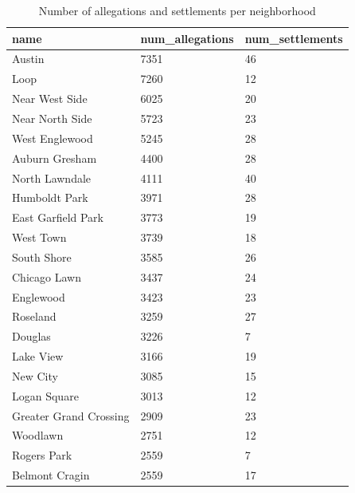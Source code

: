 \documentclass{article}
\begin{document}
\begin{table}[h!]
\centering
\caption{Number of allegations and settlements per neighborhood}
\label{table4}
\begin{tabular}{|l|l|l|}
\hline
name                   & num\_allegations & num\_settlements \\
\hline
Austin                 & 7351             & 46               \\
Loop                   & 7260             & 12               \\
Near West Side         & 6025             & 20               \\
Near North Side        & 5723             & 23               \\
West Englewood         & 5245             & 28               \\
Auburn Gresham         & 4400             & 28               \\
North Lawndale         & 4111             & 40               \\
Humboldt Park          & 3971             & 28               \\
East Garfield Park     & 3773             & 19               \\
West Town              & 3739             & 18               \\
South Shore            & 3585             & 26               \\
Chicago Lawn           & 3437             & 24               \\
Englewood              & 3423             & 23               \\
Roseland               & 3259             & 27               \\
Douglas                & 3226             & 7                \\
Lake View              & 3166             & 19               \\
New City               & 3085             & 15               \\
Logan Square           & 3013             & 12               \\
Greater Grand Crossing & 2909             & 23               \\
Woodlawn               & 2751             & 12               \\
Rogers Park            & 2559             & 7                \\
Belmont Cragin         & 2559             & 17               \\

\end{tabular}
\end{table}
\end{document}

